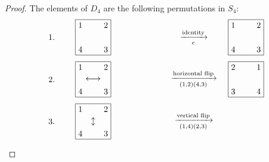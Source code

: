 \documentclass[12pt,reqno]{article}
\theoremstyle{plain}
\theoremstyle{definition}
\begin{document}
\begin{proof} The elements of \(D_4\) are the following permutations in \(S_4\):
    \begin{align*}
        &\begin{tikzpicture}
            \draw (0,0) -- (0,1.5) -- (1.5,1.5) -- (1.5,0) -- (0,0);
            \node at (-1, 0.75) {1.};
            \node[above right] at (0,0) {4};
            \node[below right] at (0,1.5) {1};
            \node[below left] at (1.5,1.5) {2};
            \node[above left] at (1.5,0) {3};
            \node at (5,0.75) {\(\xrightarrow[e]{\text{identity}}\)};
        \end{tikzpicture}
        &\begin{tikzpicture}
            \draw (0,0) -- (0,1.5) -- (1.5,1.5) -- (1.5,0) -- (0,0);
            \node[below right] at (0,1.5) {1};
            \node[below left] at (1.5,1.5) {2};
            \node[above left] at (1.5,0) {3};
            \node[above right] at (0,0) {4};
        \end{tikzpicture}
        \\
        &\begin{tikzpicture}
            \draw (0,0) -- (0,1.5) -- (1.5,1.5) -- (1.5,0) -- (0,0);
            \node at (-1, 0.75) {2.};
            \node[below right] at (0,1.5) {1};
            \node[below left] at (1.5,1.5) {2};
            \node[above left] at (1.5,0) {3};
            \node[above right] at (0,0) {4};
            \node at (0.75,0.75) {\(\longleftrightarrow\)};
            \node at (5,0.75) {\(\xrightarrow[(1,2)(4,3)]{\text{horizontal flip}}\)};
        \end{tikzpicture}
        &\begin{tikzpicture}
            \draw (0,0) -- (0,1.5) -- (1.5,1.5) -- (1.5,0) -- (0,0);
            \node[below right] at (0,1.5) {2};
            \node[below left] at (1.5,1.5) {1};
            \node[above left] at (1.5,0) {4};
            \node[above right] at (0,0) {3};
        \end{tikzpicture}
        \\
        &\begin{tikzpicture}
            \draw (0,0) -- (0,1.5) -- (1.5,1.5) -- (1.5,0) -- (0,0);
            \node at (-1, 0.75) {3.};
            \node[below right] at (0,1.5) {1};
            \node[below left] at (1.5,1.5) {2};
            \node[above left] at (1.5,0) {3};
            \node[above right] at (0,0) {4};
            \node at (0.75,0.75) {\(\updownarrow\)};
            \node at (5,0.75) {\(\xrightarrow[(1,4)(2,3)]{\text{vertical flip}}\)};

\end{tikzpicture}
\end{align*}
\end{proof}
\end{document}

